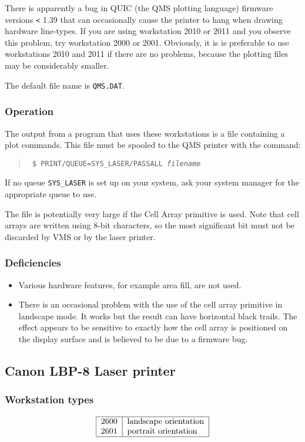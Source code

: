 There is apparently a bug in QUIC (the QMS plotting language) firmware versions
{\tt <} 1.39 that can occasionally cause the printer to hang when drawing
hardware line-types. If you are using workstation 2010 or 2011 and you observe
this problem, try workstation 2000 or 2001. Obviously, it is is preferable
to use workstations 2010 and 2011 if there are no problems, because the
plotting files may be considerably smaller.

The default file name is {\tt QMS.DAT}.

\subsubsection{Operation}
The output from a program that uses these workstations is a file containing a
plot commands. This file must be spooled to the QMS printer with the command:
\begin{quote}\tt
\$ PRINT/QUEUE=SYS\_LASER/PASSALL  {\em filename}
\end{quote}

If no queue {\tt SYS\_LASER} is set up on your system, ask your system manager
for the appropriate queue to use.

The file is potentially very large if the Cell Array primitive is used.
Note that cell arrays are written using 8-bit characters, so the most
significant bit must not be discarded by VMS or by the laser printer.

\subsubsection{Deficiencies}
\begin{itemize}
\item Various hardware features, for example area fill, are not used.
\item There is an occasional problem with the use of the cell array primitive
in landscape mode. It works but the result can have horizontal black trails.
The effect appears to be sensitive to exactly how the cell array is positioned
on the display surface and is believed to be due to a firmware bug.
\end{itemize}

\subsection{Canon LBP-8 Laser printer}
\label{can}
\subsubsection{Workstation types}
\[\begin{tabular}{|l|l|}\hline
2600 &landscape orientation\\
2601 &portrait orientation\\\hline
\end{tabular}\]

